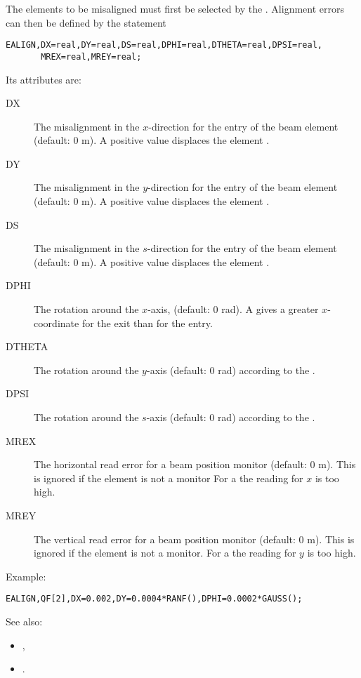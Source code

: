 The elements to be misaligned must first be selected by the 
.
Alignment errors can then be defined by the statement
\begin{verbatim}
EALIGN,DX=real,DY=real,DS=real,DPHI=real,DTHETA=real,DPSI=real,
       MREX=real,MREY=real;
\end{verbatim}
Its attributes are:
\begin{description}
\item[DX]
  The misalignment in the $x$-direction
  for the entry of the beam element (default: 0 m).
  A positive value displaces the element 
  .
\item[DY]
  The misalignment in the $y$-direction
  for the entry of the beam element (default: 0 m).
  A positive value displaces the element 
  .
\item[DS]
  The misalignment in the $s$-direction
  for the entry of the beam element (default: 0 m).
  A positive value displaces the element 
  .
\item[DPHI]
  The rotation around the $x$-axis, (default: 0 rad).
  A  gives a greater $x$-coordinate for the exit 
  than for the entry.
\item[DTHETA]
  The rotation around the $y$-axis (default: 0 rad) according to 
  the .
\item[DPSI]
  The rotation around the $s$-axis (default: 0 rad) according to 
  the .
\item[MREX]
  The horizontal read error for a beam position monitor (default: 0 m).
  This is ignored if the element is not a monitor
  For a  the reading for $x$ is too high.
\item[MREY]
  The vertical read error for a beam position monitor (default: 0 m).
  This is ignored if the element is not a monitor.
  For a  the reading for $y$ is too high.
\end{description}
Example:
\begin{verbatim}
EALIGN,QF[2],DX=0.002,DY=0.0004*RANF(),DPHI=0.0002*GAUSS();
\end{verbatim}
See also: 
\begin{itemize}
\item {},
\item {}.
\end{itemize}


